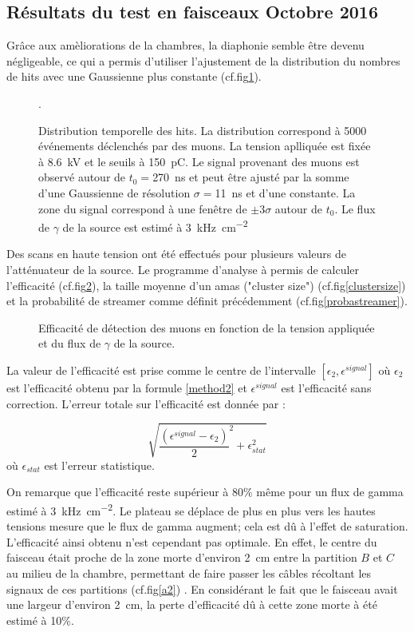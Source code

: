 \subsection{Résultats du test en faisceaux Octobre 2016}
Grâce aux amèliorations de la chambres, la diaphonie semble être devenu négligeable, ce qui a permis d'utiliser l'ajustement de la distribution du nombres de hits avec une Gaussienne plus constante (cf.fig\ref{ajust}).
\begin{figure}
	\centering
	\scalebox{1.3}{}
	\caption{Distribution temporelle des hits. La distribution correspond à 5000 événements déclenchés par des muons. La tension aplliquée est fixée à \SI{8.6}{\kilo\volt} et le seuils à \SI{150}{\pico\coulomb}. Le signal provenant des muons est observé autour de $t_0=$\SI{270}{\nano\second} et peut être ajusté par la somme d'une Gaussienne de résolution $\sigma=$\SI{11}{\nano\second} et d'une constante. La zone du signal correspond à une fenêtre de $\pm 3 \sigma$ autour de $t_0$. Le flux de $\gamma$ de la source est estimé à \SI{3}{\kilo\hertz\per\square\centi\meter}}.
	\label{ajust}
\end{figure}

 Des scans en haute tension ont été effectués pour plusieurs valeurs de l'atténuateur de la source. Le programme d'analyse à permis de calculer l'efficacité (cf.fig\ref{effifi}), la taille moyenne d'un amas ("cluster size") (cf.fig\ref{clustersize}) et la probabilité de streamer comme définit précédemment (cf.fig\ref{probastreamer}).

 \begin{figure}
 	\centering
 	\scalebox{1.3}{}
 	\caption{Efficacité de détection des muons en fonction de la tension appliquée et du flux de $\gamma$ de la source.}
 	\label{effifi}
 \end{figure}

La valeur de l'efficacité est prise comme le centre de l'intervalle $\left[\epsilon_2,\epsilon^{signal}\right]$ où $\epsilon_2$ est l'efficacité obtenu par la formule \ref{method2} et $\epsilon^{signal}$ est l'efficacité sans correction. L'erreur totale sur l'efficacité est donnée par :

\begin{equation}
\sqrt{{\frac{\left(\epsilon^{signal}-\epsilon_2\right)}{2}}^2+\epsilon_{stat}^2}
\end{equation}
où $\epsilon_{stat}$ est l'erreur statistique.

On remarque que l'efficacité reste supérieur à 80\% même pour un flux de gamma estimé à \SI{3}{\kilo\hertz\per\square\centi\meter}. Le plateau se déplace de plus en plus vers les hautes tensions  mesure que le flux de gamma augment; cela est dû à l'effet de saturation. L'efficacité ainsi obtenu n'est cependant pas optimale. En effet, le centre du faisceau était proche de la zone morte d'environ \SI{2}{\centi\meter} entre la partition $B$ et $C$ au milieu de la chambre, permettant de faire passer les câbles récoltant les signaux de ces partitions (cf.fig\ref{a2}) . En considérant le fait que le faisceau avait une largeur d'environ \SI{2}{\centi\meter}, la perte d'efficacité dû à cette zone morte à été estimé à 10\%.


